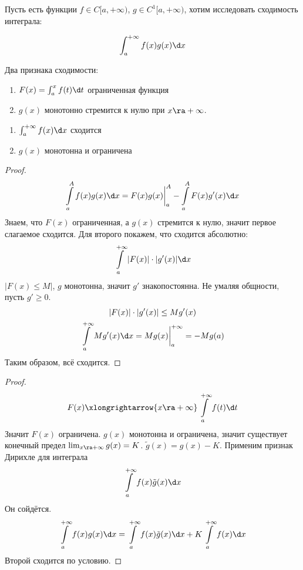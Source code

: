 Пусть есть функции $f \in C[a, +\infty)$, $g \in C^1[a, +\infty)$, хотим исследовать сходимость интеграла:

\[ \int_a^{+\infty} f(x) g(x) \d x \]

Два признака сходимости:
\begin{theorem}
	\begin{enumerate}
		\item $F(x) = \int_a^x f(t) \d t$ ограниченная функция
		\item $g(x)$ монотонно стремится к нулю при $x \ra +\infty$.
	\end{enumerate}
\end{theorem}

\begin{theorem}
	\begin{enumerate}
		\item $\int_a^{+\infty} f(x) \d x$ сходится
		\item $g(x)$ монотонна и ограничена
	\end{enumerate}
\end{theorem}

\begin{proof}
	\[ \int\limits_a^A f(x) g(x) \d x = F(x) g(x) \biggr|_a^A - \int\limits_a^A F(x) g'(x) \d x \]
	Знаем, что $F(x)$ ограниченная, а $g(x)$ стремится к нулю, значит первое слагаемое сходится.
	Для второго покажем, что сходится абсолютно:
	\[ \int\limits_a^{+\infty} |F(x)|\cdot|g'(x)| \d x \]
	$|F(x) \le M|$, $g$ монотонна, значит $g'$ знакопостоянна.
	Не умаляя общности, пусть $g' \ge 0$.
	\begin{gather*}
		|F(x)| \cdot |g'(x)| \le Mg'(x) \\
		\int\limits_a^{+\infty} Mg'(x) \d x = Mg(x) \biggr|_a^{+\infty} = -Mg(a)
	\end{gather*}
	Таким образом, всё сходится.
\end{proof}

\begin{proof}
	\[ F(x) \xlongrightarrow{x \ra +\infty} \int\limits_a^{+\infty} f(t) \d t\]
	Значит $F(x)$ ограничена.
	$g(x)$ монотонна и ограничена, значит существует конечный предел $\lim_{x\ra+\infty} g(x) = K$.
	$\tilde g(x) = g(x) - K$.
	Применим признак Дирихле для интеграла
	\[ \int\limits_a^{+\infty} f(x) \tilde g(x) \d x \]
	Он сойдётся.
	\[ \int\limits_a^{+\infty} f(x) g(x) \d x = \int\limits_a^{+\infty} f(x) \tilde g(x) \d x + K \int\limits_a^{+\infty} f(x) \d x \]
	Второй сходится по условию.
\end{proof}

